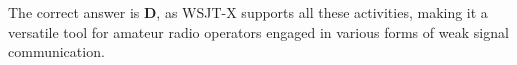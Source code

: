 The correct answer is \textbf{D}, as WSJT-X supports all these activities, making it a versatile tool for amateur radio operators engaged in various forms of weak signal communication.

